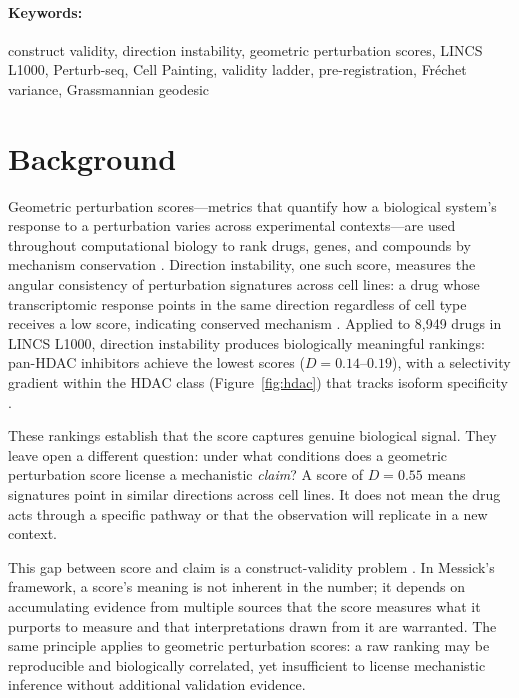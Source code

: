 \documentclass[11pt]{article}
\begin{document}
\paragraph{Keywords:} construct validity, direction instability, geometric perturbation scores, LINCS L1000, Perturb-seq, Cell Painting, validity ladder, pre-registration, Fr\'{e}chet variance, Grassmannian geodesic

\section{Background}

Geometric perturbation scores---metrics that quantify how a biological
system's response to a perturbation varies across experimental
contexts---are used throughout computational biology to rank drugs, genes,
and compounds by mechanism conservation
\citep{lamb2006connectivity,subramanian2017next}. Direction instability,
one such score, measures the angular consistency of perturbation signatures
across cell lines: a drug whose transcriptomic response points in the same
direction regardless of cell type receives a low score, indicating conserved
mechanism \citep{tower2026drug}. Applied to 8{,}949 drugs in LINCS L1000,
direction instability produces biologically meaningful rankings: pan-HDAC
inhibitors achieve the lowest scores ($D = 0.14$--$0.19$), with a
selectivity gradient within the HDAC class (Figure~\ref{fig:hdac})
that tracks isoform specificity \citep{tower2026atlas}.

These rankings establish that the score captures genuine biological signal.
They leave open a different question: under what conditions does a
geometric perturbation score license a mechanistic \emph{claim}? A score
of $D = 0.55$ means signatures point in similar directions across cell
lines. It does not mean the drug acts through a specific pathway or that
the observation will replicate in a new context.

This gap between score and claim is a construct-validity problem
\citep{messick1995validity}. In Messick's framework, a score's meaning is
not inherent in the number; it depends on accumulating evidence from
multiple sources that the score measures what it purports to measure and
that interpretations drawn from it are warranted. The same principle
applies to geometric perturbation scores: a raw ranking may be
reproducible and biologically correlated, yet insufficient to license
mechanistic inference without additional validation evidence.
\end{document}
